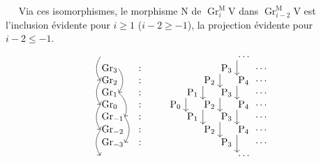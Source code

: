 \documentclass[11pt,leqno]{article}
\newcommand{\Page}[1]{\ifvmode\noindent\else\unskip\ \fi{\footnotesize\textcolor{gray}{[p.\,#1]}}\ \ignorespaces}
\begin{document}
\Page{166}
Via ces isomorphismes, le morphisme \(\mathrm{N}\) de \(\operatorname{Gr}_i^{\mathrm{M}}\mathrm{V}\) dans \(\operatorname{Gr}_{i-2}^{\mathrm{M}}\mathrm{V}\) est l’inclusion évidente pour \(i\ge1\) (\(i-2\ge-1\)), la projection évidente pour \(i-2\le-1\).
\[
\begin{tikzcd}[
  ampersand replacement=\&,
  row sep=0.2em,
  column sep=0.4em,
  cells={nodes={anchor=west,inner sep=1pt}}
]
\phantom{\operatorname{Gr}_4}
  \arrow[dd,bend right=35,start anchor=west,end anchor=west]
  \&[0.8em] \&[2em] \& \& \& \&
  \cdots\arrow[dd,start anchor=south west,end anchor=north west] \& \\
\operatorname{Gr}_3
  \arrow[dd,bend left=35,start anchor=east,end anchor=east]
  \& \colon \& \& \& \&
  \mathrm{P}_3\arrow[dd,start anchor=south west,end anchor=north west]
  \& \& \cdots \\
\operatorname{Gr}_2
  \arrow[dd,bend right=35,start anchor=west,end anchor=west]
  \& \colon \& \& \&
  \mathrm{P}_2\arrow[dd,start anchor=south west,end anchor=north west]
  \& \&
  \mathrm{P}_4\arrow[dd,start anchor=south west,end anchor=north west]
  \& \cdots \\
\operatorname{Gr}_1
  \arrow[dd,bend left=35,start anchor=east,end anchor=east]
  \& \colon \& \&
  \mathrm{P}_1\arrow[dd,start anchor=south west,end anchor=north west]
  \& \&
  \mathrm{P}_3\arrow[dd,start anchor=south west,end anchor=north west]
  \& \& \cdots \\
\operatorname{Gr}_0
  \arrow[dd,bend right=35,start anchor=west,end anchor=west]
  \& \colon \& \mathrm{P}_0 \& \&
  \mathrm{P}_2\arrow[dd,start anchor=south west,end anchor=north west]
  \& \&
  \mathrm{P}_4\arrow[dd,start anchor=south west,end anchor=north west]
  \& \cdots \\
\operatorname{Gr}_{-1}
  \arrow[dd,bend left=35,start anchor=east,end anchor=east]
  \& \colon \& \& \mathrm{P}_1 \& \&
  \mathrm{P}_3\arrow[dd,start anchor=south west,end anchor=north west]
  \& \& \cdots \\
\operatorname{Gr}_{-2}
  \arrow[dd,bend right=35,start anchor=west,end anchor=west]
  \& \colon \& \& \& \mathrm{P}_2 \& \&
  \mathrm{P}_4\arrow[dd,start anchor=south west,end anchor=north west]
  \& \cdots \\
\operatorname{Gr}_{-3}
  \& \colon \& \& \& \& \mathrm{P}_3 \& \& \cdots \\
\phantom{\operatorname{Gr}_{-4}}
  \& \& \& \& \& \& \cdots \&
\end{tikzcd}
\]
\end{document}
